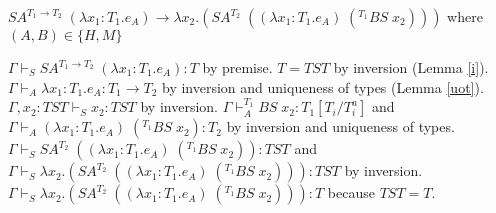 \begin{case}
$SA^{T_{1}\rightarrow T_{2}}\;(\lambda x_{1}:T_{1}.e_{A})\rightarrow\lambda x_{2}.(SA^{T_{2}}\;((\lambda x_{1}:T_{1}.e_{A})\;(^{T_{1}}BS\;x_{2})))$ where $(A,B)\in\lbrace H,M\rbrace$

$\Gamma\vdash_{S}SA^{T_{1}\rightarrow T_{2}}\;(\lambda x_{1}:T_{1}.e_{A}):T$ by premise.  $T=TST$ by inversion (Lemma \ref{i}).  $\Gamma\vdash_{A}\lambda x_{1}:T_{1}.e_{A}:T_{1}\rightarrow T_{2}$ by inversion and uniqueness of types (Lemma \ref{uot}).  $\Gamma,x_{2}:TST\vdash_{S}x_{2}:TST$ by inversion.  $\Gamma\vdash_{A}^{T_{1}}BS\;x_{2}:T_{1}[T_{i}/T_{i}^{a}]$ and $\Gamma\vdash_{A}(\lambda x_{1}:T_{1}.e_{A})\;(^{T_{1}}BS\;x_{2}):T_{2}$ by inversion and uniqueness of types.  $\Gamma\vdash_{S}SA^{T_{2}}\;((\lambda x_{1}:T_{1}.e_{A})\;(^{T_{1}}BS\;x_{2})):TST$ and $\Gamma\vdash_{S}\lambda x_{2}.(SA^{T_{2}}\;((\lambda x_{1}:T_{1}.e_{A})\;(^{T_{1}}BS\;x_{2}))):TST$ by inversion.  $\Gamma\vdash_{S}\lambda x_{2}.(SA^{T_{2}}\;((\lambda x_{1}:T_{1}.e_{A})\;(^{T_{1}}BS\;x_{2}))):T$ because $TST=T$.
\end{case}
